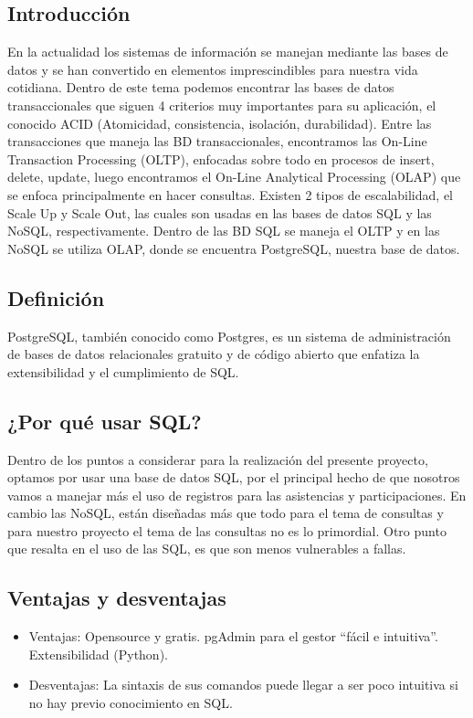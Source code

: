 \documentclass{article}
\begin{document}
\subsection{Introducción}
En la actualidad los sistemas de información se manejan mediante las bases de
datos y se han convertido en elementos imprescindibles para nuestra vida
cotidiana. Dentro de este tema podemos encontrar las bases de datos
transaccionales que siguen 4 criterios muy importantes para su aplicación, el
conocido ACID (Atomicidad, consistencia, isolación, durabilidad). Entre las
transacciones que maneja las BD transaccionales, encontramos las On-Line
Transaction Processing (OLTP), enfocadas sobre todo en procesos de insert,
delete, update, luego encontramos el On-Line Analytical Processing (OLAP) que se
enfoca principalmente en hacer consultas. Existen 2 tipos de escalabilidad, el
Scale Up y Scale Out, las cuales son usadas en las bases de datos SQL y las
NoSQL, respectivamente. Dentro de las BD SQL se maneja el OLTP y en las NoSQL se
utiliza OLAP, donde se encuentra PostgreSQL, nuestra base de datos.

\subsection{Definición}
PostgreSQL, también conocido como Postgres, es un sistema de administración de
bases de datos relacionales gratuito y de código abierto que enfatiza la
extensibilidad y el cumplimiento de SQL.

\subsection{¿Por qué usar SQL?}
Dentro de los puntos a considerar para la realización del presente proyecto,
optamos por usar una base de datos SQL, por el principal hecho de que nosotros
vamos a manejar más el uso de registros para las asistencias y participaciones.
En cambio las NoSQL, están diseñadas más que todo para el tema de consultas y
para nuestro proyecto el tema de las consultas no es lo primordial. Otro punto
que resalta en el uso de las SQL, es que son menos vulnerables a fallas.

\subsection{Ventajas y desventajas}
\begin{itemize}
    \item Ventajas: Opensource y gratis. pgAdmin para el gestor ``fácil e intuitiva''.
        Extensibilidad (Python).
    \item Desventajas: La sintaxis de sus comandos puede llegar a
        ser poco intuitiva si no hay previo conocimiento en SQL.
\end{itemize}
\end{document}
